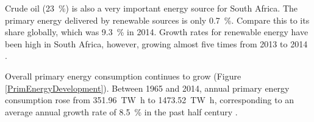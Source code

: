 Crude oil (\SI{23}{\percent}) is also a very important energy source for South Africa. The primary energy delivered by renewable sources is only \SI{0.7}{\percent}. Compare this to its share globally, which was \SI{9.3}{\percent} in 2014. Growth rates for renewable energy have been high in South Africa, however, growing almost five times from 2013 to 2014 \cite{BP2015b}.

Overall primary energy consumption continues to grow (Figure \ref{PrimEnergyDevelopment}). Between 1965 and 2014, annual primary energy consumption rose from \SI{351.96}{\tera\watt\hour} to \SI{1473.52}{\tera\watt\hour}, corresponding to an average annual growth rate of \SI{8.5}{\percent} in the past half century \cite{BP2015c}.

